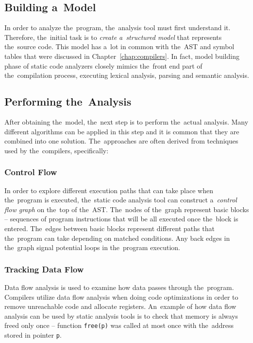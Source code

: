 \documentclass[
  digital, %
  table,   %
  lof,     %
  lot,     %
  oneside,
]{fithesis3}
\begin{document}
\subsection{Building a~Model}
In order to analyze the~program, the~analysis tool must first understand it. Therefore, the~initial task is to \textit{create a~structured model} that represents the~source code. This model has a~lot in common with the~AST and symbol tables that were discussed in Chapter~\ref{chap:compilers}. In fact, model building phase of static code analyzers closely mimics the~front end part of the~compilation process, executing lexical analysis, parsing and semantic analysis.

\subsection{Performing the~Analysis}
After obtaining the~model, the~next step is to perform the~actual analysis. Many different algorithms can be applied in this step and it is common that they are combined into one solution. The~approaches are often derived from techniques used by the~compilers, specifically:

\subsubsection{\textbf{Control Flow}}
In order to explore different execution paths that can take place when the~program is executed, the~static code analysis tool can construct a~\textit{control flow graph} on the~top of the~AST. The~nodes of the~graph represent basic blocks -- sequences of program instructions that will be all executed once the~block is entered. The~edges between basic blocks represent different paths that the~program can take depending on matched conditions. Any back edges in the~graph signal potential loops in the~program execution.

\subsubsection{\textbf{Tracking Data Flow}}
Data flow analysis is used to examine how data passes through the~program. Compilers utilize data flow analysis when doing code optimizations in order to remove unreachable code and allocate registers. An~example of how data flow analysis can be used by static analysis tools is to check that memory is always freed only once -- function \texttt{free(p)} was called at most once with the~address stored in pointer \texttt{p}.
\end{document}

